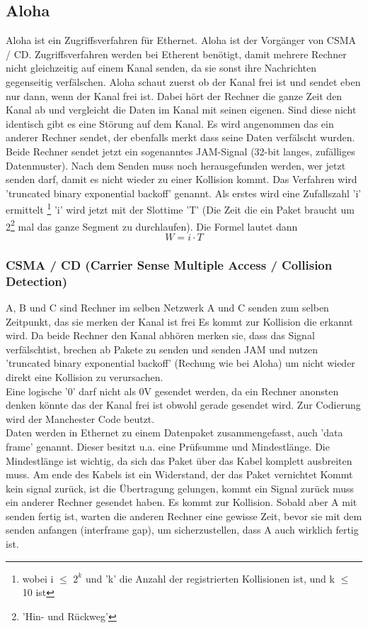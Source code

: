 \documentclass[a4paper,10pt]{scrartcl}
\begin{document}
        \subsection{Aloha}
            Aloha ist ein Zugriffsverfahren für Ethernet. Aloha ist der Vorgänger von CSMA / CD. Zugriffsverfahren werden bei Etherent benötigt, damit mehrere Rechner nicht gleichzeitig
            auf einem Kanal senden, da sie sonst ihre Nachrichten gegenseitig verfälschen. 
            Aloha schaut zuerst ob der Kanal frei ist und sendet eben nur dann, wenn der Kanal frei ist. 
            Dabei hört der Rechner die ganze Zeit den Kanal ab und vergleicht die Daten im Kanal mit seinen eigenen. Sind diese nicht identisch gibt es eine Störung auf dem Kanal. 
            Es wird angenommen das ein anderer Rechner sendet, der ebenfalls merkt dass seine Daten verfälscht wurden. 
            Beide Rechner sendet jetzt ein sogenanntes JAM-Signal (32-bit langes, zufälliges Datenmuster). Nach dem Senden muss noch herausgefunden werden, wer jetzt senden darf, damit es nicht wieder 
            zu einer Kollision kommt. Das Verfahren wird 'truncated binary exponential backoff' genannt. Als erstes wird eine Zufallszahl 'i' ermittelt 
            \footnote{wobei i $\leq$ $2^k$ und 'k' die Anzahl der registrierten Kollisionen ist, und k $\leq$ 10 ist}
            'i' wird jetzt mit der Slottime 'T' (Die Zeit die ein Paket braucht um 2\footnote{'Hin- und Rückweg'} mal das ganze Segment zu durchlaufen). Die Formel lautet dann 
            \[ W = i \cdot T \] 

        \subsubsection{CSMA / CD (Carrier Sense Multiple Access / Collision Detection)}
            A, B und C sind Rechner im selben Netzwerk
            A und C senden zum selben Zeitpunkt, das sie merken der Kanal ist frei
            Es kommt zur Kollision die erkannt wird. Da beide Rechner den Kanal abhören merken sie,
            dass das Signal verfälschtist, brechen ab Pakete zu senden und senden JAM  und nutzen 'truncated binary exponential backoff' (Rechung wie bei Aloha) um
            nicht wieder direkt eine Kollision zu verursachen. \\
            Eine logische '0' darf nicht als 0V gesendet werden, da ein Rechner anonsten denken könnte das der Kanal frei ist obwohl gerade gesendet wird. Zur Codierung wird
            der Manchester Code beutzt. \\
            Daten werden in Ethernet zu einem Datenpaket zusammengefasst, auch 'data frame' genannt. Dieser besitzt u.a. eine Prüfsumme und Mindestlänge.
            Die Mindestlänge ist wichtig, da sich das Paket über das Kabel komplett ausbreiten muss. Am ende des Kabels ist ein Widerstand, der das Paket vernichtet
            Kommt kein signal zurück, ist die Übertragung gelungen, kommt ein Signal zurück muss ein anderer Rechner gesendet haben. Es kommt zur Kollision.
            Sobald aber A mit senden fertig ist, warten die anderen Rechner eine gewisse Zeit, bevor sie mit dem senden anfangen (interframe gap), um sicherzustellen, dass
            A auch wirklich fertig ist. 
\end{document}

